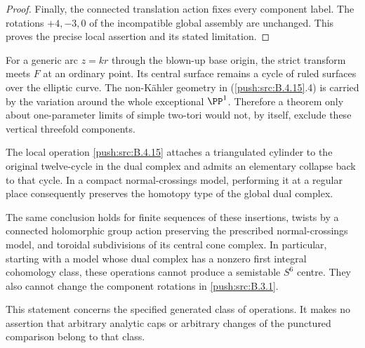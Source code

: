 \begin{proof}
Finally, the connected translation action fixes every
component label. The rotations $+4,-3,0$ of the
incompatible global assembly are unchanged. This proves
the precise local assertion and its stated limitation.
\end{proof}

\begin{remark}
For a generic arc $z=kr$ through the blown-up base
origin, the strict transform meets $F$ at an ordinary
point. Its central surface remains a cycle of ruled
surfaces over the elliptic curve. The non-K\"ahler
geometry in (\ref{push:src:B.4.15}.4) is carried by the variation
around the whole exceptional $\PP^1$. Therefore a
theorem only about one-parameter limits of simple
two-tori would not, by itself, exclude these vertical
threefold components.
\end{remark}


\begin{proposition}\label{push:src:B.4.16}
\label{push:B416}
The local operation \ref{push:src:B.4.15} attaches a triangulated
cylinder to the original twelve-cycle in the dual
complex and admits an elementary collapse back to that
cycle. In a compact normal-crossings model, performing
it at a regular place consequently preserves the
homotopy type of the global dual complex.

The same conclusion holds for finite sequences of these
insertions, twists by a connected holomorphic group
action preserving the prescribed normal-crossings
model, and toroidal subdivisions of its central cone
complex. In particular, starting with a model whose
dual complex has a nonzero first integral cohomology
class, these operations cannot produce a semistable
$S^6$ centre. They also cannot change the component
rotations in \ref{push:src:B.3.1}.

This statement concerns the specified generated class
of operations. It makes no assertion that arbitrary
analytic caps or arbitrary changes of the punctured
comparison belong to that class.
\end{proposition}


